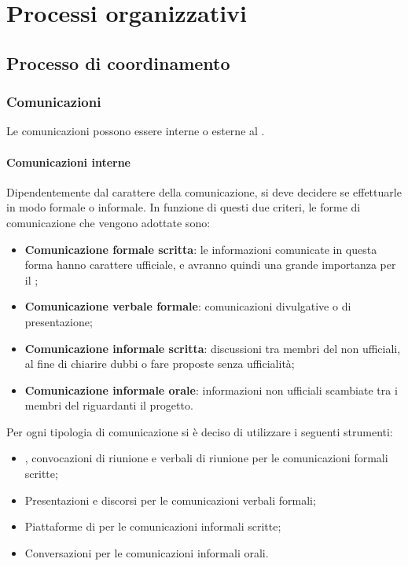 \section{Processi organizzativi}
\subsection{Processo di coordinamento}
\subsubsection{Comunicazioni}
Le comunicazioni possono essere interne o esterne al .

\paragraph{Comunicazioni interne}
Dipendentemente dal carattere della comunicazione, si deve decidere se effettuarle in modo formale o informale.
In funzione di questi due criteri, le forme di comunicazione che vengono adottate sono:
\begin{itemize}
	\item \textbf{Comunicazione formale scritta}: le informazioni comunicate in questa forma hanno carattere ufficiale, e avranno quindi una grande importanza per il ;
	\item \textbf{Comunicazione verbale formale}: comunicazioni divulgative o di presentazione;
	\item \textbf{Comunicazione informale scritta}: discussioni tra membri del  non ufficiali, al fine di chiarire dubbi o fare proposte senza ufficialità;
	\item \textbf{Comunicazione informale orale}: informazioni non ufficiali scambiate tra i membri del  riguardanti il progetto.
\end{itemize}

Per ogni tipologia di comunicazione si è deciso di utilizzare i seguenti strumenti:
\begin{itemize}
	\item \textit{\PdP}, convocazioni di riunione e verbali di riunione per le comunicazioni formali scritte;
	\item Presentazioni e discorsi per le comunicazioni verbali formali;
	\item Piattaforme di  per le comunicazioni informali scritte;
	\item Conversazioni per le comunicazioni informali orali.
\end{itemize}

